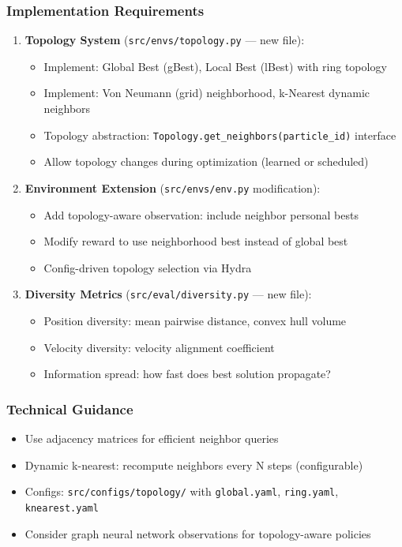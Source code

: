 \documentclass[11pt,a4paper]{scrartcl}
\newcommand{\codepath}[1]{\colorbox{codehighlight}{\texttt{#1}}}
\begin{document}
\subsubsection*{Implementation Requirements}
\begin{enumerate}[leftmargin=1.4em]
    \item \textbf{Topology System} (\codepath{src/envs/topology.py} --- new file):
    \begin{itemize}
        \item Implement: Global Best (gBest), Local Best (lBest) with ring topology
        \item Implement: Von Neumann (grid) neighborhood, k-Nearest dynamic neighbors
        \item Topology abstraction: \texttt{Topology.get\_neighbors(particle\_id)} interface
        \item Allow topology changes during optimization (learned or scheduled)
    \end{itemize}
    
    \item \textbf{Environment Extension} (\codepath{src/envs/env.py} modification):
    \begin{itemize}
        \item Add topology-aware observation: include neighbor personal bests
        \item Modify reward to use neighborhood best instead of global best
        \item Config-driven topology selection via Hydra
    \end{itemize}
    
    \item \textbf{Diversity Metrics} (\codepath{src/eval/diversity.py} --- new file):
    \begin{itemize}
        \item Position diversity: mean pairwise distance, convex hull volume
        \item Velocity diversity: velocity alignment coefficient
        \item Information spread: how fast does best solution propagate?
    \end{itemize}
\end{enumerate}

\subsubsection*{Technical Guidance}
\begin{itemize}
    \item Use adjacency matrices for efficient neighbor queries
    \item Dynamic k-nearest: recompute neighbors every N steps (configurable)
    \item Configs: \codepath{src/configs/topology/} with \texttt{global.yaml}, \texttt{ring.yaml}, \texttt{knearest.yaml}
    \item Consider graph neural network observations for topology-aware policies
\end{itemize}
\end{document}
